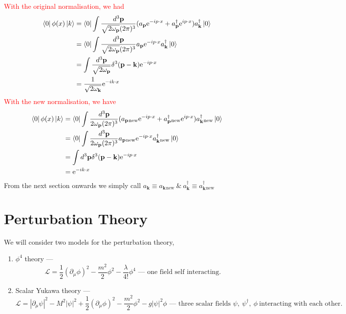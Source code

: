 \documentclass[11pt, notitlepage]{report}
\newcommand{\del}{\partial}
\newcommand{\e}{\mathrm{e}}
\newcommand{\w}{\omega}
\newcommand{\ld}{\mathcal{L}}
\renewcommand{\a}[1]{a_\mathbf{#1}}
\newcommand{\adag}[1]{a^\dagger_\mathbf{#1}}
\numberwithin{equation}{section}
\begin{document}
    \textcolor{red}{
        With the original normalisation, we had 
        \begin{align*}
            \bra{0} \phi(x)\ket{k} &= \bra{0}\int \frac{d^3\textbf{p}}{\sqrt{2\w_\textbf{p}}(2\pi)^3} (\a{p}\e^{-ip\cdot x} + \adag{p} \e^{ip\cdot x}) \adag{k} \ket{0}\\
            & = \bra{0}\int \frac{d^3\textbf{p}}{\sqrt{2\w_\textbf{p}}(2\pi)^3} \a{p}\e^{-ip\cdot x} \adag{k}\ket{0} \\
            & = \int \frac{d^3\textbf{p}}{\sqrt{2\w_\textbf{p}}} \delta^3(\textbf{p} - \textbf{k})\e^{-ip\cdot x}\\
            & = \frac{1}{\sqrt{2\w_\textbf{k}}}\e^{-ik\cdot x}
        \end{align*}
        With the new normalisation, we have 
        \begin{align*}
            \bra{0} \phi(x)\ket{k} &= \bra{0}\int \frac{d^3\textbf{p}}{2\w_\textbf{p}(2\pi)^3} (\a{p}{}_{\text{new}}\e^{-ip\cdot x} + \adag{p}{}_{\text{new}} \e^{ip\cdot x})\adag{k}{}_{\text{new}} \ket{0}\\
            & = \bra{0}\int \frac{d^3\textbf{p}}{2\w_\textbf{p}(2\pi)^3} \a{p}{}_{\text{new}}\e^{-ip\cdot x} \adag{k}{}_{\text{new}}\ket{0} \\
            & = \int d^3\textbf{p} \delta^3(\textbf{p} - \textbf{k})\e^{-ip\cdot x}\\
            & =\e^{-ik\cdot x}
        \end{align*}
    }
    From the next section onwards we simply call \(\a{k} \equiv \a{k}{}_{\text{new}}~\&~\adag{k} \equiv \adag{k}{}_{\text{new}}\)

    \newpage
    \section{Perturbation Theory}
    We will consider two models for the perturbation theory, \\
    \begin{enumerate}
        \item \(\phi^4\) theory — \begin{equation*}
            \ld = \frac{1}{2}(\del_\mu \phi)^2 - \frac{m^2}{2}\phi^2 - \frac{\lambda}{4!}\phi^4\text{   — one field self interacting.}
        \end{equation*}
        \item Scalar Yukawa theory — \begin{equation*}
            \ld = |\del_\mu \psi|^2 - M^2 |\psi|^2 + \frac{1}{2}(\del_\mu \phi)^2 - \frac{m^2}{2}\phi^2 - g|\psi|^2\phi \text{   — three scalar  fields } \psi,~\psi^\dagger,~\phi~\text{interacting with each other.} 
        \end{equation*}
    \end{enumerate}
\end{document}
